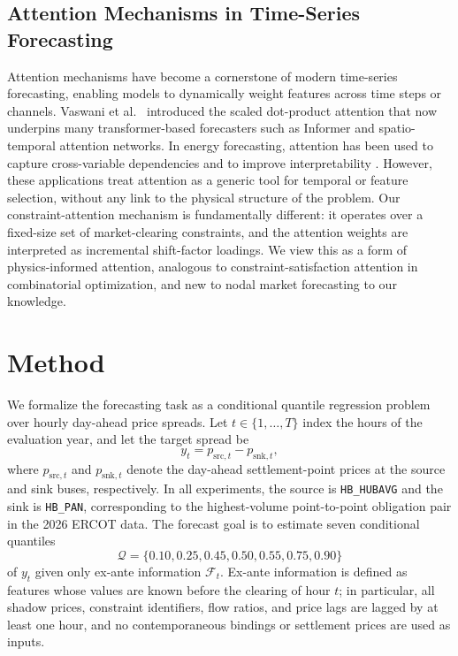 \documentclass{article}
\begin{document}
\subsection{Attention Mechanisms in Time-Series Forecasting}
Attention mechanisms have become a cornerstone of modern time-series forecasting, enabling models to dynamically weight features across time steps or channels. Vaswani et al.~\cite{vaswani2017attention} introduced the scaled dot-product attention that now underpins many transformer-based forecasters such as Informer \cite{zhou2021informer} and spatio-temporal attention networks. In energy forecasting, attention has been used to capture cross-variable dependencies and to improve interpretability \cite{zyl2023harnessing}. However, these applications treat attention as a generic tool for temporal or feature selection, without any link to the physical structure of the problem. Our constraint-attention mechanism is fundamentally different: it operates over a fixed-size set of market-clearing constraints, and the attention weights are interpreted as incremental shift-factor loadings. We view this as a form of physics-informed attention, analogous to constraint-satisfaction attention in combinatorial optimization, and new to nodal market forecasting to our knowledge.

\section{Method}
\label{sec:method}

We formalize the forecasting task as a conditional quantile regression problem over hourly day-ahead price spreads. Let $t \in \{1,\dots,T\}$ index the hours of the evaluation year, and let the target spread be
\[
y_t = p_{\mathrm{src},t} - p_{\mathrm{snk},t},
\]
where $p_{\mathrm{src},t}$ and $p_{\mathrm{snk},t}$ denote the day-ahead settlement-point prices at the source and sink buses, respectively. In all experiments, the source is \texttt{HB\_HUBAVG} and the sink is \texttt{HB\_PAN}, corresponding to the highest-volume point-to-point obligation pair in the 2026 ERCOT data. The forecast goal is to estimate seven conditional quantiles
\[
\mathcal{Q} = \{0.10, 0.25, 0.45, 0.50, 0.55, 0.75, 0.90\}
\]
of $y_t$ given only ex-ante information $\mathcal{F}_t$. Ex-ante information is defined as features whose values are known before the clearing of hour $t$; in particular, all shadow prices, constraint identifiers, flow ratios, and price lags are lagged by at least one hour, and no contemporaneous bindings or settlement prices are used as inputs.
\end{document}

